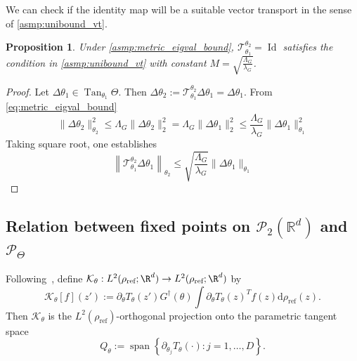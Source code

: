 \documentclass{article} %
\newtheorem{proposition}{Proposition}[section]
\numberwithin{equation}{subsection}
\numberwithin{theorem}{section}
\newcommand{\dd}{\mathrm{d}}
\newcommand{\cK}{\mathcal{K}}
\newcommand{\cT}{\mathcal{T}}
\newcommand{\Id}{\operatorname{Id}}
\newcommand{\rhoref}{{\rho_{\text{ref}}}}
\newcommand{\Wspace}{\mathcal{P}_2(\mathbb{R}^d)}
\newcommand{\PWspace}{\mathcal{P}_\Theta}
\begin{document}
    We can check if the identity map will be a suitable vector transport in the sense of \autoref{asmp:unibound_vt}.
    \begin{proposition}
        Under \autoref{asmp:metric_eigval_bound}, $\cT_{\theta_1}^{\theta_2} = \Id$ satisfies the condition in \autoref{asmp:unibound_vt} with constant $M = \sqrt{\frac{\Lambda_{G}}{\lambda_{G}}}$.
    \end{proposition}
    \begin{proof}
        Let $\Delta\theta_1 \in \operatorname{Tan}_{\theta_1}\Theta$.
        Then $\Delta\theta_2 := \cT_{\theta_1}^{\theta_2}\Delta\theta_1 = \Delta\theta_1$.
        From \eqref{eq:metric_eigval_bound} 
        \begin{equation*}
            \| \Delta\theta_2\|^2_{\theta_2} \leq 
                \Lambda_{G} \| \Delta\theta_2\|^2_2 =
                \Lambda_{G} \| \Delta\theta_1\|^2_2 \leq
                 \frac{\Lambda_{G}}{\lambda_{G}}\| \Delta\theta_1\|^2_{\theta_1} 
        \end{equation*}
        Taking square root, one establishes
        \begin{equation*}
            \left\|\cT_{\theta_1}^{\theta_2}\Delta\theta_1\right\|_{\theta_2} \leq \sqrt{\frac{\Lambda_{G}}{\lambda_{G}}}\| \Delta\theta_1\|_{\theta_1}
        \end{equation*}
    \end{proof}


\subsection{Relation between fixed points on $\Wspace$ and $\PWspace$}
Following~\cite[Lemma~3.14]{wu2025parameterized}, define
$\cK_{\theta}:L^2(\rhoref;\R^d)\to L^2(\rhoref;\R^d)$ by
\begin{equation}\label{eq:op_proj}
    \cK_{\theta}[f](z')
    :=
    \partial_{\theta}T_{\theta}(z')
    G^{\dagger}(\theta)
    \int
        \partial_{\theta}T_{\theta}(z)^T f(z)
    \dd\rhoref(z).
\end{equation}
Then $\cK_\theta$ is the $L^2(\rhoref)$-orthogonal projection onto the
parametric tangent space
\[
    Q_{\theta}
    :=
    \operatorname{span}
    \left\{
        \partial_{\theta_j}T_{\theta}(\cdot)
        :
        j=1,\ldots,D
    \right\}.
\]
\end{document}
